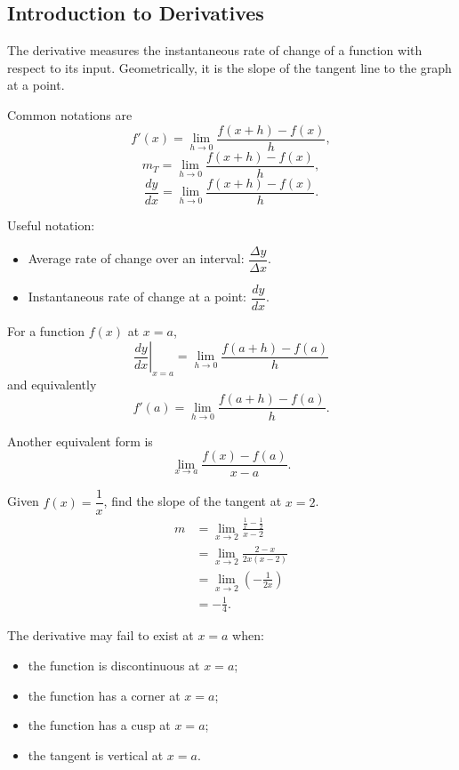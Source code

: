 \subsection{Introduction to Derivatives}

\begin{definition}[Derivative]
The derivative measures the instantaneous rate of change of a function with respect to its input. Geometrically, it is the slope of the tangent line to the graph at a point.

Common notations are
\[
  f'(x) = \lim_{h \to 0} \frac{f(x+h)-f(x)}{h},
\]
\[
  m_T = \lim_{h \to 0} \frac{f(x+h)-f(x)}{h},
\]
\[
  \frac{dy}{dx} = \lim_{h \to 0} \frac{f(x+h)-f(x)}{h}.
\]
\end{definition}

\noindent Useful notation:
\begin{itemize}
  \item Average rate of change over an interval: $\dfrac{\Delta y}{\Delta x}$.
  \item Instantaneous rate of change at a point: $\dfrac{dy}{dx}$.
\end{itemize}

For a function $f(x)$ at $x=a$,
\[
\left.\frac{dy}{dx}\right|_{x=a} = \lim_{h\to 0}\frac{f(a+h)-f(a)}{h}
\]
and equivalently
\[
f'(a) = \lim_{h\to 0}\frac{f(a+h)-f(a)}{h}.
\]

Another equivalent form is
\[
\lim_{x \to a}\frac{f(x)-f(a)}{x-a}.
\]

\begin{example}
Given $f(x)=\dfrac{1}{x}$, find the slope of the tangent at $x=2$.
\begin{align*}
m &= \lim_{x\to 2}\frac{\frac{1}{x}-\frac{1}{2}}{x-2} \\
  &= \lim_{x\to 2}\frac{2-x}{2x(x-2)} \\
  &= \lim_{x\to 2}\left(-\frac{1}{2x}\right) \\
  &= -\frac{1}{4}.
\end{align*}
\end{example}

The derivative may fail to exist at $x=a$ when:
\begin{itemize}
  \item the function is discontinuous at $x=a$;
  \item the function has a corner at $x=a$;
  \item the function has a cusp at $x=a$;
  \item the tangent is vertical at $x=a$.
\end{itemize}
